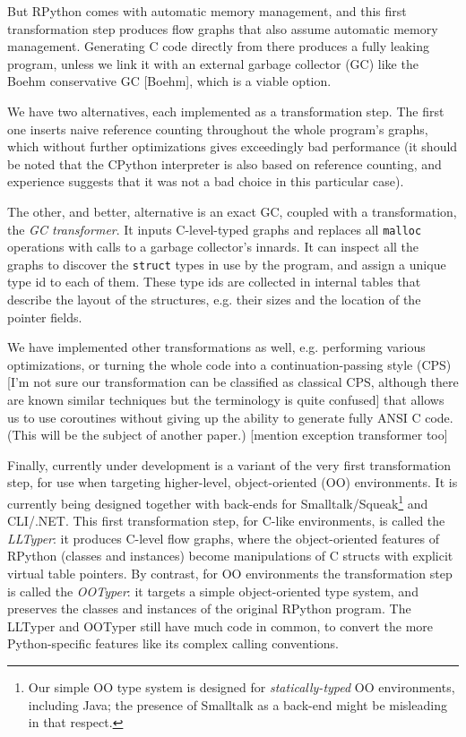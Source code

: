 \documentclass{acm_proc_article-sp}
\begin{document}
But RPython comes with automatic memory management, and this first
transformation step produces flow graphs that also assume automatic
memory management.  Generating C code directly from there produces a
fully leaking program, unless we link it with an external garbage
collector (GC) like the Boehm conservative GC [Boehm], which is a
viable option.

We have two alternatives, each implemented as a transformation step.
The first one inserts naive reference counting throughout the whole
program's graphs, which without further optimizations gives exceedingly
bad performance (it should be noted that the CPython interpreter is also
based on reference counting, and experience suggests that it was not a
bad choice in this particular case).

The other, and better, alternative is an exact GC, coupled with a
transformation, the \textit{GC transformer}.  It inputs C-level-typed graphs
and replaces all \texttt{malloc} operations with calls to a garbage
collector's innards.  It can inspect all the graphs to discover the
\texttt{struct} types in use by the program, and assign a unique type id to
each of them.  These type ids are collected in internal tables that
describe the layout of the structures, e.g. their sizes and the location
of the pointer fields.

We have implemented other transformations as well, e.g. performing
various optimizations, or turning the whole code into a
continuation-passing style (CPS) [I'm not sure our transformation
can be classified as classical CPS, although there are known similar techniques but the terminology is quite confused] that allows us to use coroutines
without giving up the ability to generate fully ANSI C code.  (This will
be the subject of another paper.)  [mention exception transformer too]

Finally, currently under development is a variant of the very first
transformation step, for use when targeting higher-level,
object-oriented (OO) environments.  It is currently being designed
together with back-ends for Smalltalk/Squeak\footnote{Our simple OO
type system is designed for \textit{statically-typed} OO environments,
including Java; the presence of Smalltalk as a back-end might be
misleading in that respect.} and CLI/.NET.  This first transformation
step, for C-like environments, is called the \textit{LLTyper}: it produces
C-level flow graphs, where the object-oriented features of RPython
(classes and instances) become manipulations of C structs with
explicit virtual table pointers.  By contrast, for OO environments the
transformation step is called the \textit{OOTyper}: it targets a simple
object-oriented type system, and preserves the classes and instances
of the original RPython program.  The LLTyper and OOTyper still have
much code in common, to convert the more Python-specific features like
its complex calling conventions.
\end{document}
